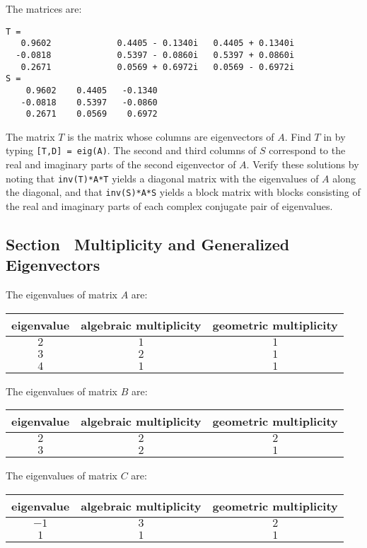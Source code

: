 \documentclass{ximera}
\begin{document}
\ans The matrices are:
\begin{verbatim}
T =
   0.9602             0.4405 - 0.1340i   0.4405 + 0.1340i
  -0.0818             0.5397 - 0.0860i   0.5397 + 0.0860i
   0.2671             0.0569 + 0.6972i   0.0569 - 0.6972i
S =
    0.9602    0.4405   -0.1340
   -0.0818    0.5397   -0.0860
    0.2671    0.0569    0.6972
\end{verbatim}

\soln The matrix $T$ is the matrix whose columns are eigenvectors of $A$. 
Find $T$ in \Matlab by typing {\tt [T,D] = eig(A)}.  The second and third columns
of $S$ correspond to the real and imaginary parts of the second eigenvector
of $A$.  Verify these solutions by noting that
{\tt inv(T)*A*T} yields a diagonal matrix with the eigenvalues of $A$
along the diagonal, and that {\tt inv(S)*A*S} yields a block matrix
with blocks consisting of the real and imaginary parts of each complex
conjugate pair of eigenvalues.


\subsection*{Section~\protect{\ref{S:MGE}} Multiplicity and Generalized Eigenvectors}

 The eigenvalues of matrix $A$ are:
\begin{center}
\begin{tabular}{|c|c|c|}
\hline
eigenvalue & algebraic multiplicity & geometric multiplicity \\
\hline
$2$ & $1$ & $1$ \\
$3$ & $2$ & $1$ \\
$4$ & $1$ & $1$ \\
\hline
\end{tabular}
\end{center}


 The eigenvalues of matrix $B$ are:
\begin{center}
\begin{tabular}{|c|c|c|}
\hline
eigenvalue & algebraic multiplicity & geometric multiplicity \\
\hline
$2$ & $2$ & $2$ \\
$3$ & $2$ & $1$ \\
\hline
\end{tabular}
\end{center}

 The eigenvalues of matrix $C$ are:
\begin{center}
\begin{tabular}{|c|c|c|}
\hline
eigenvalue & algebraic multiplicity & geometric multiplicity \\
\hline
$-1$ & $3$ & $2$ \\
$1$ & $1$ & $1$ \\
\hline
\end{tabular}
\end{center}
\end{document}
